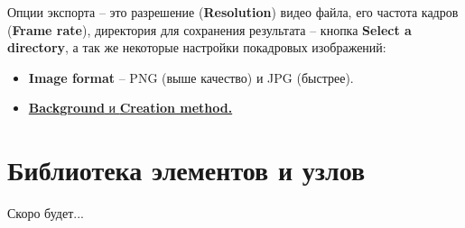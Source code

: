 \documentclass[a4paper,12pt]{article}
\begin{document}
Опции экспорта -- это разрешение (\textbf{Resolution}) видео файла, его частота кадров (\textbf{Frame rate}), директория для сохранения результата -- кнопка \textbf{Select a directory}, а так же некоторые настройки покадровых изображений:

\begin{itemize}
	\item \textbf{Image format} -- PNG (выше качество) и JPG (быстрее).
	\item \href{https://wiki.freecad.org/Std_ViewScreenShot}{\textbf{Background} и \textbf{Creation method.}}
\end{itemize}

\pagebreak


\section{Библиотека элементов и узлов}

Скоро будет...
\end{document}
